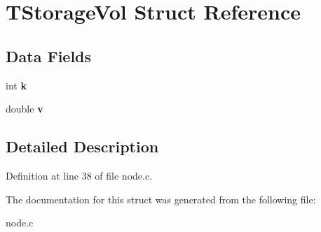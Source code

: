 \hypertarget{struct_t_storage_vol}{}\section{T\+Storage\+Vol Struct Reference}
\label{struct_t_storage_vol}
\subsection*{Data Fields}
\begin{DoxyCompactItemize}
\item 
\mbox{\label{struct_t_storage_vol_ab66ed8e0098c0a86b458672a55a9cca9}} 
int {\bfseries k}
\item 
\mbox{\label{struct_t_storage_vol_a3b90d5a73541ab9402511d87bed076ef}} 
double {\bfseries v}
\end{DoxyCompactItemize}


\subsection{Detailed Description}


Definition at line 38 of file node.\+c.



The documentation for this struct was generated from the following file\+:\begin{DoxyCompactItemize}
\item 
node.\+c\end{DoxyCompactItemize}
